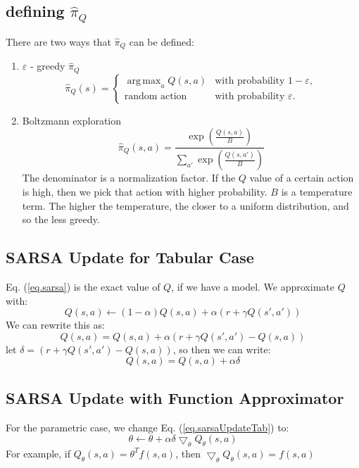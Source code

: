 \documentclass[11pt]{article}
\numberwithin{equation}{section}
\numberwithin{figure}{section}
\begin{document}
\subsection*{defining $\hat{\pi}_Q$}
There are two ways that $\hat{\pi}_Q$ can be defined:
\begin{enumerate}
	\item $\varepsilon$ - greedy $\hat{\pi}_Q$
		\begin{equation}
			\hat{\pi}_Q(s) = 
			\begin{cases}
				\operatorname{arg\,max}_{a}Q(s,a) & \text{with probability } 1 - \varepsilon, \\
				\text{random action} & \text{with probability } \varepsilon.
			\end{cases}
		\end{equation}
	\item Boltzmann exploration
		\begin{equation}
			\hat{\pi}_Q(s,a) =\frac{\exp(\frac{Q(s,a)}{B})}{\sum_{a'}\exp(\frac{Q(s,a')}{B})}
		\end{equation}
		The denominator is a normalization factor.  If the $Q$ value of a certain action is high, then we pick that action with higher probability.  $B$ is a temperature term.  The higher the temperature, the closer to a uniform distribution, and so the less greedy.
\end{enumerate}

\subsection*{SARSA Update for Tabular Case}
Eq. (\ref{eq.sarsa}) is the exact value of $Q$, if we have a model.  We approximate $Q$ with:
\begin{equation}
	Q(s,a) \leftarrow (1 - \alpha) Q(s,a) + \alpha(r + \gamma Q(s',a'))
	\label{eq.sarsaApprox}
\end{equation}
We can rewrite this as:
\begin{equation}
	Q(s,a) = Q(s,a) + \alpha(r + \gamma Q(s',a') - Q(s,a))
\end{equation}
let $\delta = (r + \gamma Q(s',a') - Q(s,a))$, so then we can write:
\begin{equation}
	Q(s,a) = Q(s,a) + \alpha \delta
	\label{eq.sarsaUpdateTab}
\end{equation}
\subsection*{SARSA Update with Function Approximator}
For the parametric case, we change Eq. (\ref{eq.sarsaUpdateTab}) to:
\begin{equation}
	\theta \leftarrow \theta + \alpha \delta \bigtriangledown_\theta Q_\theta(s,a)
\end{equation}
For example, if $Q_\theta(s,a) = \theta^T f(s,a)$, then $\bigtriangledown_\theta Q_\theta(s,a) = f(s,a)$
\end{document}
